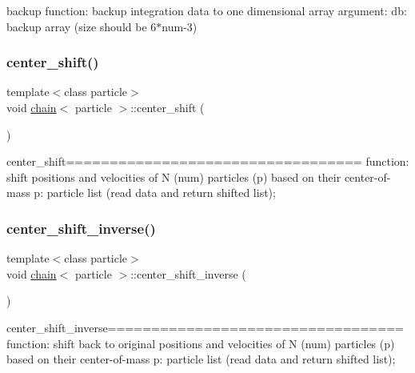 backup function\+: backup integration data to one dimensional array argument\+: db\+: backup array (size should be 6$\ast$num-\/3) 

\hypertarget{classchain_a4282f016d3dd10774815ba7c32c0e021}{}\label{classchain_a4282f016d3dd10774815ba7c32c0e021} 
\subsubsection{\texorpdfstring{center\+\_\+shift()}{center\_shift()}}
{\footnotesize\ttfamily template$<$class particle$>$ \\
void \hyperlink{classchain}{chain}$<$ particle $>$\+::center\+\_\+shift (\begin{DoxyParamCaption}{ }\end{DoxyParamCaption})\hspace{0.3cm}{\ttfamily [inline]}}



center\+\_\+shift================================== function\+: shift positions and velocities of N (num) particles (p) based on their center-\/of-\/mass p\+: particle list (read data and return shifted list); 

\hypertarget{classchain_a623ee5de9bc2a5548e2e3b026fa083d9}{}\label{classchain_a623ee5de9bc2a5548e2e3b026fa083d9} 
\subsubsection{\texorpdfstring{center\+\_\+shift\+\_\+inverse()}{center\_shift\_inverse()}}
{\footnotesize\ttfamily template$<$class particle$>$ \\
void \hyperlink{classchain}{chain}$<$ particle $>$\+::center\+\_\+shift\+\_\+inverse (\begin{DoxyParamCaption}{ }\end{DoxyParamCaption})\hspace{0.3cm}{\ttfamily [inline]}}



center\+\_\+shift\+\_\+inverse================================== function\+: shift back to original positions and velocities of N (num) particles (p) based on their center-\/of-\/mass p\+: particle list (read data and return shifted list); 


